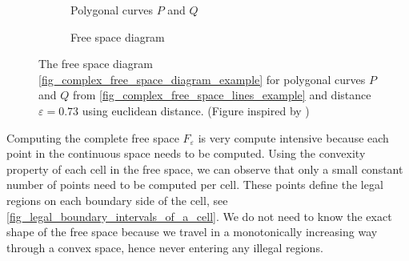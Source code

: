 \documentclass[
oneside,
fontsize=11pt
]{scrartcl}
\begin{document}
\begin{figure}[ht]
  \centering
  \begin{subfigure}[b]{0.45\textwidth}
      \resizebox{\textwidth}{!}{
        
      }
      \caption{Polygonal curves $P$ and $Q$}
      \label{fig_complex_free_space_lines_example}
  \end{subfigure}
  \hfill
  \begin{subfigure}[b]{0.45\textwidth}
      \caption{Free space diagram}
      \label{fig_complex_free_space_diagram_example}
  \end{subfigure}
  \caption[Complex free space diagram example]{
    The free space diagram \autoref{fig_complex_free_space_diagram_example} 
    for polygonal curves $P$ and $Q$ from \autoref{fig_complex_free_space_lines_example} 
    and distance $\varepsilon = 0.73$ using euclidean distance. (Figure inspired by \cite{buchin_four_2017})}
  \label{fig_complex_free_space}
\end{figure}

Computing the complete free space $F_\varepsilon$ is very compute intensive 
because each point in the continuous space needs to be computed. 
Using the convexity property of each cell in the free space,
we can observe that only a small constant number of points need to be computed per cell. 
These points define the legal regions on each boundary side of the cell, see \autoref{fig_legal_boundary_intervals_of_a_cell}. 
We do not need to know the exact shape of the free space 
because we travel in a monotonically increasing way through a convex space,
hence never entering any illegal regions.
\end{document}
